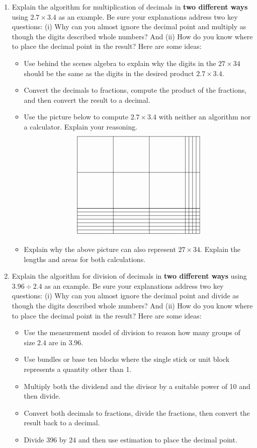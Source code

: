 \begin{problems}
\begin{enumerate}
\item Explain the algorithm for multiplication of decimals in \textbf{two different ways} using $2.7\times 3.4$ as an example.  Be sure your explanations address two key questions:  (i) Why can you almost ignore the decimal point and multiply as though the digits described whole numbers?  And (ii) How do you know where to place the decimal point in the result?  Here are some ideas:  
\begin{itemize}
\item Use behind the scenes algebra to explain why the digits in the  $27\times 34$ should be the same as the digits in the desired product $2.7\times 3.4$.  
\item Convert the decimals to fractions, compute the product of the fractions, and then convert the result to a decimal.  
\item Use the picture below to compute $2.7\times 3.4$ with neither an algorithm nor a calculator.  Explain your reasoning.  
\[
\begin{tikzpicture}[scale=1.8]
\draw (0,0) grid (3,2);
\draw [xstep=1cm,ystep=1mm] (0,-0.7) grid (3,0);
\draw [xstep=1mm,ystep=1cm] (3,0) grid (3.4,2);
\draw [xstep=1mm,ystep=1mm] (3,-0.7) grid (3.4,0);
\end{tikzpicture}
\]
\item Explain why the above picture can also represent $27\times 34$.  Explain the lengths and areas for both calculations.  

\end{itemize}

\item Explain the algorithm for division of decimals in \textbf{two different ways} using $3.96\div 2.4$ as an example.  Be sure your explanations address two key questions:  (i) Why can you almost ignore the decimal point and divide as though the digits described whole numbers?  And (ii) How do you know where to place the decimal point in the result?  Here are some ideas:  
\begin{itemize}
\item Use the measurement model of division to reason how many groups of size $2.4$ are in $3.96$.
\item Use bundles or base ten blocks where the single stick or unit block represents a quantity other than 1.  
\item Multiply both the dividend and the divisor by a suitable power of 10 and then divide.  
\item Convert both decimals to fractions, divide the fractions, then convert the result back to a decimal.  
\item Divide $396$ by $24$ and then use estimation to place the decimal point.  
\end{itemize}

\end{enumerate}
\end{problems}



